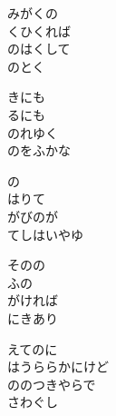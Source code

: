 \documentclass[10pt,b5j]{tarticle} %
\begin{document}
\vspace{1.5em} %
\newcommand{\linespace}{0.5em} %
\newcommand{\blocksize}{0.5\hsize} %
\begin{enumerate} %
    \begin{minipage}[c]{\blocksize}
    
        \vspace{\linespace}
        \item
        みがくの\\
        くひくれば\\
        のはくして\\
        のとく
        
        \vspace{\linespace}
        \item
        きにも\\
        るにも\\
        のれゆく\\
        のをふかな
        
        \vspace{\linespace}
        \item
        の\\
        はりて\\
        がびのが\\
        てしはいやゆ
        
        \vspace{\linespace}
        \item
        そのの\\
        ふの\\
        がければ\\
        にきあり
        
        \vspace{\linespace}
        \item
        えてのに\\
        はうららかにけど\\
        ののつきやらで\\
        さわぐし
        

\end{minipage}
\end{enumerate}
\end{document}
